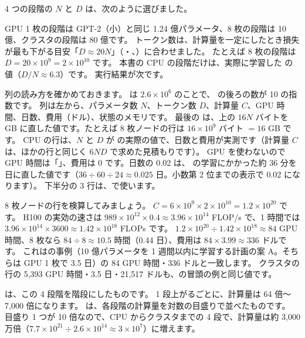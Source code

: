 4 つの段階の $N$ と $D$ は、次のように選びました。


GPU 1 枚の段階は GPT-2（小）と同じ 1.24 億パラメータ、8 枚の段階は 10 億、クラスタの段階は 80 億です。
トークン数は、計算量を一定にしたとき損失が最も下がる目安「$D\approx 20N$」（・、\cite{hoffmann2022training}）に合わせました。
たとえば 8 枚の段階は $D = 20 \times 10^{9} = 2\times10^{10}$ です。
本書の CPU の段階だけは、実際に学習した  の値（$D/N \approx 6.3$）です。
実行結果が次です。


列の読み方を確かめておきます。
 は $2.6\times10^{6}$ のことで、 の後ろの数が 10 の指数です。
列は左から、パラメータ数 $N$、トークン数 $D$、計算量 $C$、GPU 時間、日数、費用（ドル）、状態のメモリです。
最後の  は、上の $16N$ バイトを GB に直した値です。たとえば 8 枚ノードの行は $16\times10^{9}$ バイト $=16$ GB です。
CPU の行は、$N$ と $D$ が  の実際の値で、日数と費用が実測です（計算量 $C$ は、ほかの行と同じく $6ND$ で求めた見積もりです）。
GPU を使わないので GPU 時間は「\code{-}」、費用は 0 です。日数の 0.02 は、 の学習にかかった約 36 分を日に直した値です（$36\div60\div24\approx0.025$ 日。小数第 2 位までの表示で 0.02 になります）。
下半分の 3 行は、で使います。

8 枚ノードの行を検算してみましょう。
$C = 6 \times 10^{9} \times 2\times10^{10} = 1.2\times10^{20}$ です。
H100 の実効の速さは $989\times10^{12} \times 0.4 \approx 3.96\times10^{14}$ FLOP/s で、1 時間では $3.96\times10^{14}\times3600 \approx 1.42\times10^{18}$ FLOPs です。
$1.2\times10^{20} \div 1.42\times10^{18} \approx 84$ GPU 時間、8 枚なら $84 \div 8 \approx 10.5$ 時間（0.44 日）、費用は $84 \times 3.99 \approx 336$ ドルです。
これはの事例（10 億パラメータを 1 週間以内に学習する計画の案 A。そちらは GPU 1 枚で 3.5 日）の 84 GPU 時間・336 ドルと一致します。
クラスタの行の 5,393 GPU 時間・3.5 日・21,517 ドルも、の冒頭の例と同じ値です。

は、この 4 段階を階段にしたものです。
1 段上がるごとに、計算量は 64 倍〜7,000 倍になります。
は、各段階の計算量を対数の目盛りで並べたものです。
目盛り 1 つが 10 倍なので、CPU からクラスタまでの 4 段で、計算量は約 3,000 万倍（$7.7\times10^{21} \div 2.6\times10^{14}\approx3\times10^{7}$）に増えます。

